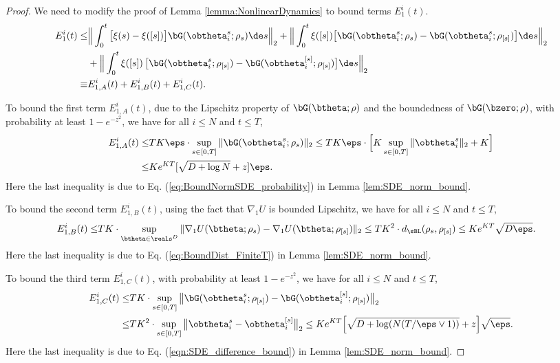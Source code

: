 \documentclass[11pt]{article}
\begin{document}
\begin{proof}
We need to modify the proof of Lemma \ref{lemma:NonlinearDynamics} to bound terms $E_1^i(t)$. 
\begin{equation}
\begin{aligned}
E_1^i(t)\le& \Big\| \int_{0}^t \big[\xi(s) -\xi([s])\big] \bG(\obtheta_i^{s};\rho_s) \de s\Big\|_2 + \Big\| \int_0^t \xi([s]) \big[ \bG(\obtheta_i^{s};\rho_s)- \bG(\obtheta_i^{s};\rho_{[s]}) \big] \de s\Big\|_2\\
&+\Big\|\int_0^t\xi([s])\, \big[\bG(\obtheta_i^s;\rho_{[s]})- \bG(\obtheta_i^{[s]};\rho_{[s]}) \big]\de s\Big\|_2 \\
\equiv& E_{1, A}^i(t) + E_{1, B}^i(t) + E_{1, C}^i(t). 
\end{aligned}
\end{equation}

To bound the first term $E_{1, A}^i(t)$, due to the Lipschitz property of $\bG(\btheta; \rho)$ and the boundedness of $\bG(\bzero; \rho)$, with probability at least $1 - e^{-z^2}$, we have for all $i \le N$ and $t \le T$, 
\begin{equation}\label{eqn:bound_E_1_A}
\begin{aligned}
E_{1, A}^i(t) \le& T K \eps \cdot \sup_{s \in [0, T]} \| \bG(\obtheta_i^s; \rho_s) \|_2 \le T K \eps \cdot \Big[ K \sup_{s \in [0, T]} \| \obtheta_i^s \|_2 + K\Big]\\
\le&  K e^{KT}  [\sqrt{D + \log N} + z] \eps. 
\end{aligned}
\end{equation}
Here the last inequality is due to Eq. (\ref{eq:BoundNormSDE_probability}) in Lemma \ref{lem:SDE_norm_bound}.

To bound the second term $E_{1, B}^i(t)$, using the fact that $\nabla_{1} U$ is bounded Lipschitz, we have for all $i \le N$ and $t \le T$, 
\begin{equation}\label{eqn:bound_E_1_B}
\begin{aligned}
E_{1, B}^i(t) \le& T K  \cdot \sup_{\btheta \in \reals^D} \| \nabla_1 U(\btheta; \rho_s) - \nabla_1 U(\btheta; \rho_{[s]}) \|_2 \le  T K^2 \cdot d_{\sBL}(\rho_s, \rho_{[s]}) \le K e^{KT} \sqrt{D \eps}. 
\end{aligned}
\end{equation}
Here the last inequality is due to Eq. (\ref{eq:BoundDist_FiniteT}) in Lemma \ref{lem:SDE_norm_bound}.

To bound the third term $E_{1, C}^i(t)$, with probability at least $1 - e^{-z^2}$, we have for all $i \le N$ and $t \le T$, 
\begin{equation}\label{eqn:bound_E_1_C}
\begin{aligned}
E_{1, C}^i(t) \le& T K \cdot \sup_{s \in [0, T]} \big\| \bG(\obtheta_i^s;\rho_{[s]})- \bG(\obtheta_i^{[s]};\rho_{[s]}) \big\|_2 \\
\le& T K^2 \cdot \sup_{s \in [0, T]} \big\| \obtheta_i^s - \obtheta_i^{[s]} \big\|_2 \le K e^{KT} \Big[\sqrt{D + \log (N(T/\eps\vee 1))} + z\Big] \sqrt{\eps}.
\end{aligned}
\end{equation}
Here the last inequality is due to Eq. (\ref{eqn:SDE_difference_bound}) in Lemma \ref{lem:SDE_norm_bound}. 


\end{proof}
\end{document}
